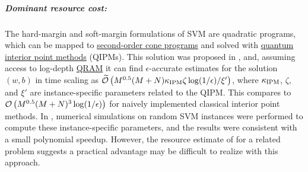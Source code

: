 \begin{refsection}
\subparagraph{Dominant resource cost:} 
The hard-margin and soft-margin formulations of SVM are quadratic programs, which can be mapped to \hyperref[appl:ConicProgramming]{second-order cone programs} and solved with \hyperref[prim:QIPM]{quantum interior point methods} (QIPMs). This solution was proposed in \cite{kerenidis2019QAlgsSecondOrderConeSVM}, and, assuming access to log-depth \hyperref[prim:QRAM]{QRAM} it can find $\epsilon$-accurate estimates for the solution $(w,b)$ in time scaling as $\widetilde{\mathcal{O}}\left( M^{0.5}(M+N)\kappa_{\rm IPM}\zeta\log(1/\epsilon)/\xi' \right)$, where $\kappa_{\rm IPM}$, $\zeta$, and $\xi'$ are instance-specific parameters related to the QIPM. This compares to $\mathcal{O}\left( M^{0.5}(M+N)^{3}\log(1/\epsilon) \right)$ for naively implemented classical interior point methods. In \cite{kerenidis2019QAlgsSecondOrderConeSVM}, numerical simulations on random SVM instances were performed to compute these instance-specific parameters, and the results were consistent with a small polynomial speedup. However, the resource estimate of \cite{dalzell2022socp} for a related problem suggests a practical advantage may be difficult to realize with this approach.


\end{refsection}
